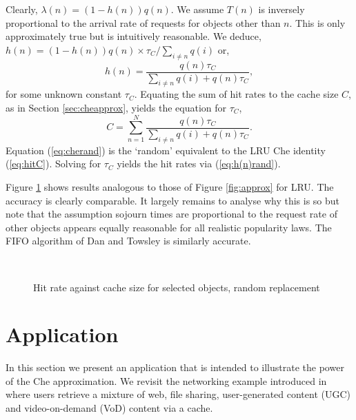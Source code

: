 \documentclass{amsart}
\begin{document}
Clearly, $\lambda(n) = (1-h(n))q(n)$.  We assume $T(n)$ is inversely proportional to the arrival rate of requests for objects other than $n$. This is only approximately true but is intuitively reasonable. We deduce, $h(n) = (1-h(n))q(n) \times  \tau_C/\sum_{i\ne n}q(i)$ or,
\begin{equation}
h(n) = \frac{q(n) \tau_C}{\sum_{i\ne n}q(i)+q(n)\tau_C},
\label{eq:h(n)rand}
\end{equation}
 for some unknown constant $\tau_C$. Equating the sum of hit rates to the cache size $C$, as in Section \ref{sec:cheapprox}, yields the equation for $\tau_C$,
\begin{equation}
C= \sum_{n=1}^N \frac{q(n) \tau_C}{\sum_{i\ne n}q(i)+q(n)\tau_C}.
 \label{eq:cherand}
 \end{equation}
 Equation (\ref{eq:cherand}) is the `random' equivalent to the LRU Che identity (\ref{eq:hitC}). Solving for $\tau_C$ yields the hit rates via (\ref{eq:h(n)rand}).

 
Figure \ref{fig:rand-approx} shows results analogous to those of Figure \ref{fig:approx} for LRU. The accuracy is  clearly comparable. It largely remains to analyse why this is so but note that the assumption sojourn times are proportional to the request rate of other objects appears equally reasonable for all realistic popularity laws. The FIFO algorithm of Dan and Towsley \cite{DT90} is similarly accurate. 
 
\begin{figure}
 \\
\hspace{-15mm}     
   \caption{Hit rate against cache size for selected objects, random replacement}
  \label{fig:rand-approx}
\end{figure}

\section{Application}
\label{sec:application}

In this section we present an application that is intended to illustrate the power of the Che approximation. We revisit the networking example introduced in \cite{FRRS12} where users retrieve a mixture of web, file sharing, user-generated content (UGC) and video-on-demand (VoD) content via a cache. 
\end{document}
